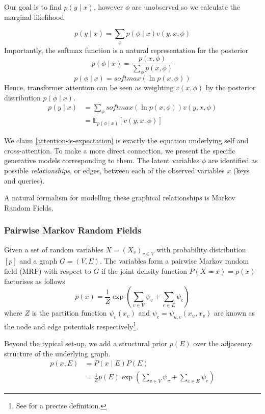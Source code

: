 \documentclass{article}
\theoremstyle{plain}
\theoremstyle{definition}
\theoremstyle{remark}
\begin{document}
Our goal is to find $p(y\mid x)$, however $\phi$ are unobserved so we calculate the marginal likelihood.

$$p(y \mid x) = \sum_\phi p(\phi \mid x)v(y, x, \phi)$$
Importantly, the softmax function is a natural representation for the posterior 
\begin{equation*}
    p(\phi \mid x) = \frac{p(x, \phi)}{\sum_{\phi} p(x,\phi)} \label{marginalised}
\end{equation*}
\begin{equation*} 
    p(\phi \mid x) = softmax(\ln p(x, \phi))
\end{equation*}
Hence, transformer attention can be seen as weighting $v(x, \phi)$ by the posterior distribution $p(\phi \mid x)$. 
\begin{equation}
\begin{split}
    p(y \mid x) &= \sum_{\phi}softmax(\ln p(x, \phi))v(y, x, \phi) \\
    &=\mathbb{E}_{p(\phi \mid x)}[v(y, x, \phi)]\label{attention-is-expectation}
\end{split}
\end{equation}

We claim \eqref{attention-is-expectation} is exactly the equation underlying self and cross-attention. To make a more direct connection, we present the specific generative models corresponding to them. The latent variables $\phi$ are identified as possible \textit{relationships}, or edges, between each of the observed variables $x$ (keys and queries). 

A natural formalism for modelling these graphical relationships is Markov Random Fields.

\subsubsection{Pairwise Markov Random Fields}
Given a set of random variables $X = (X_v)_{v\in V}$ with probability distribution $[p]$ and a graph $G = (V, E)$. The variables form a pairwise Markov random field (MRF) with respect to $G$ if the joint density function $P(X=x)=p(x)$ factorises as follows
$$p(x) = \frac{1}{Z}\exp \left( \sum_{v \in V} \psi_v +  \sum_{e \in E} \psi_e \right)$$
where $Z$ is the partition function $\psi_{v}(x_v)$ and $\psi_e=\psi_{u,v}(x_u, x_v)$ are known as the node and edge potentials respectively\footnote{See \cite{shah_learning_2021} for a precise definition.}.

Beyond the typical set-up, we add a structural prior $p(E)$ over the adjacency structure of the underlying graph.
\begin{equation*}
\begin{split}
   p(x, E) &= P(x\mid E)P(E) \\ 
    &= \frac{1}{Z}{p(E)\exp \left(\sum_{v \in V} \psi_v +  \sum_{e \in E} \psi_e\right)}
\end{split}
\end{equation*}
\end{document}
